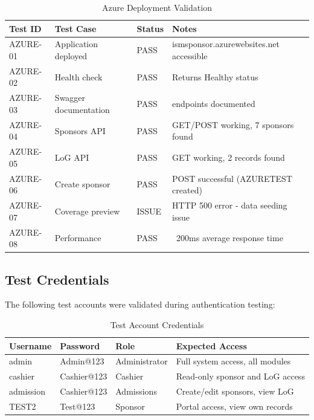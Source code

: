 \begin{table}[h!]
\centering
\caption{Azure Deployment Validation}
\label{tab:appendix_azure_deployment}
\renewcommand{\arraystretch}{1.15}
\setlength{\tabcolsep}{4pt}
\begin{tabularx}{\textwidth}{@{}
  >{\RaggedLeft\arraybackslash}p{1.5cm}
  >{\RaggedRight\arraybackslash}p{4.5cm}
  >{\RaggedLeft\arraybackslash}p{1.5cm}
  >{\RaggedRight\arraybackslash}X
@{}}
\toprule
\textbf{Test ID} & \textbf{Test Case} & \textbf{Status} & \textbf{Notes} \\
\midrule
AZURE-01 & Application deployed & PASS & ismsponsor.azurewebsites.net accessible \\
AZURE-02 & Health check & PASS & Returns Healthy status \\
AZURE-03 & Swagger documentation & PASS & 8 endpoints documented \\
AZURE-04 & Sponsors API & PASS & GET/POST working, 7 sponsors found \\
AZURE-05 & LoG API & PASS & GET working, 2 records found \\
AZURE-06 & Create sponsor & PASS & POST successful (AZURETEST created) \\
AZURE-07 & Coverage preview & ISSUE & HTTP 500 error - data seeding issue \\
AZURE-08 & Performance & PASS & ~200ms average response time \\
\bottomrule
\end{tabularx}
\end{table}

\subsection{Test Credentials}

The following test accounts were validated during authentication testing:

\begin{table}[h!]
\centering
\caption{Test Account Credentials}
\label{tab:appendix_test_accounts}
\renewcommand{\arraystretch}{1.15}
\setlength{\tabcolsep}{5pt}
\begin{tabularx}{\textwidth}{@{}
  >{\RaggedRight\arraybackslash}p{3.0cm}
  >{\RaggedRight\arraybackslash}p{3.0cm}
  >{\RaggedRight\arraybackslash}p{2.5cm}
  >{\RaggedRight\arraybackslash}X
@{}}
\toprule
\textbf{Username} & \textbf{Password} & \textbf{Role} & \textbf{Expected Access} \\
\midrule
admin & Admin@123 & Administrator & Full system access, all modules \\
cashier & Cashier@123 & Cashier & Read-only sponsor and LoG access \\
admission & Cashier@123 & Admissions & Create/edit sponsors, view LoG \\
TEST2 & Test@123 & Sponsor & Portal access, view own records \\
\bottomrule
\end{tabularx}
\end{table}

